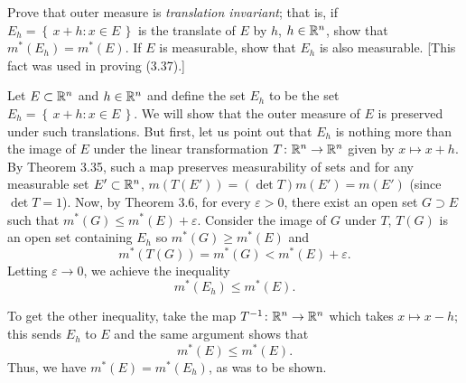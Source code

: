 \begin{problem}
  Prove that outer measure is \emph{translation invariant}; that is, if
  $E_h=\left\{\,x+h:x\in E\,\right\}$ is the translate of $E$ by $h$,
  $h\in\mathbb{R}^n$, show that $m^*(E_h)=m^*(E)$. If $E$ is measurable, show
  that $E_h$ is also measurable. [This fact was used in proving (3.37).]
\end{problem}
\begin{solution}
  Let $E\subset\mathbb{R}^n$ and $h\in\mathbb{R}^n$ and define the set $E_h$ to be the
  set $E_h=\left\{\,x+h:x\in E\,\right\}$. We will show that the outer
  measure of $E$ is preserved under such translations. But first, let us
  point out that $E_h$ is nothing more than the image of $E$ under the
  linear transformation $T\colon\mathbb{R}^n\to\mathbb{R}^n$ given by $x\mapsto
  x+h$. By Theorem 3.35, such a map preserves measurability of sets and for
  any measurable set $E'\subset\mathbb{R}^n$, $m(T(E'))=(\det T)m(E')=m(E')$
  (since $\det T=1$). Now, by Theorem 3.6, for every $\varepsilon>0$, there
  exist an open set $G\supset E$ such that $m^*(G)\leq
  m^*(E)+\varepsilon$. Consider the image of $G$ under $T$, $T(G)$ is an
  open set containing $E_h$ so $m^*(G)\geq m^*(E)$ and
  \[
    m^*(T(G))=m^*(G)<m^*(E)+\varepsilon.
  \]
  Letting $\varepsilon\to 0$, we achieve the inequality
  \[
    m^*(E_h)\leq m^*(E).
  \]

  To get the other inequality, take the map $T^{-1}\colon\mathbb{R}^n\to\mathbb{R}^n$
  which takes $x\mapsto x-h$; this sends $E_h$ to $E$ and the same argument
  shows that
  \[
    m^*(E)\leq m^*(E).
  \]
  Thus, we have $m^*(E)=m^*(E_h)$, as was to be shown.
\end{solution}

